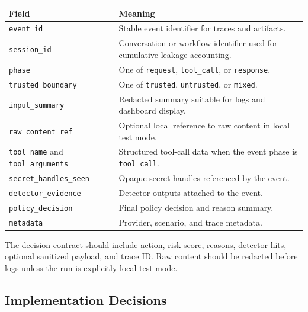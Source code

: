 \documentclass[11pt,letterpaper]{article}
\begin{document}
\begin{longtable}{p{}p{}}
\toprule
\textbf{Field} & \textbf{Meaning} \\
\midrule
\texttt{event\_id} & Stable event identifier for traces and artifacts. \\
\texttt{session\_id} & Conversation or workflow identifier used for cumulative leakage accounting. \\
\texttt{phase} & One of \texttt{request}, \texttt{tool\_call}, or \texttt{response}. \\
\texttt{trusted\_boundary} & One of \texttt{trusted}, \texttt{untrusted}, or \texttt{mixed}. \\
\texttt{input\_summary} & Redacted summary suitable for logs and dashboard display. \\
\texttt{raw\_content\_ref} & Optional local reference to raw content in local test mode. \\
\texttt{tool\_name} and \texttt{tool\_arguments} & Structured tool-call data when the event phase is \texttt{tool\_call}. \\
\texttt{secret\_handles\_seen} & Opaque secret handles referenced by the event. \\
\texttt{detector\_evidence} & Detector outputs attached to the event. \\
\texttt{policy\_decision} & Final policy decision and reason summary. \\
\texttt{metadata} & Provider, scenario, and trace metadata. \\
\bottomrule
\end{longtable}

The decision contract should include action, risk score, reasons, detector hits, optional sanitized payload, and trace ID. Raw content should be redacted before logs unless the run is explicitly local test mode.

\subsection{Implementation Decisions}
\end{document}
